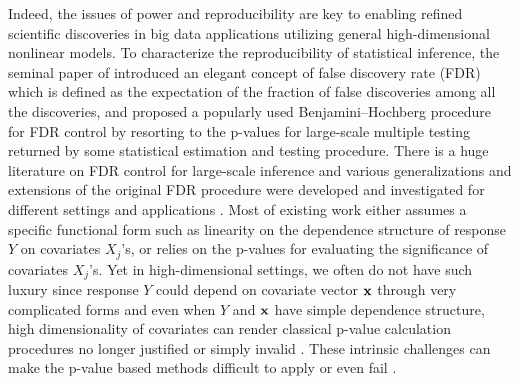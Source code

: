 \documentclass[11pt]{article}
\newcommand{\bx}{\mbox{\bf x}}
\begin{document}
Indeed, the issues of power and reproducibility are key to enabling refined scientific discoveries in big data applications utilizing general high-dimensional nonlinear models. To characterize the reproducibility of statistical inference, the seminal paper of \cite{BenjaminiHochberg1995} introduced an elegant concept of false discovery rate (FDR) which is defined as the expectation of the fraction of false discoveries among all the discoveries, and proposed a popularly used Benjamini--Hochberg %
procedure for FDR control by resorting to the p-values for large-scale multiple testing returned by some statistical estimation and testing procedure. There is a huge literature on FDR control for large-scale inference and various generalizations and extensions of the original FDR procedure were developed and investigated for different settings and applications \cite{BenjaminiYekutieli2001, EfronTibshirani2002, Storey2002, StoreyTaylorSiegmund2004, AbramovichBenjaminiDonohoJohnstone2006, Efron2007JASA, Efron2007AOS, FanHallYao2007, Wu2008, ClarkeHall2009, HallWang2010, FanFan2011, MengSunZhangWaterman2011, ZhangLiu2011, FanHanGu2012, LiuShao2014, SuCandes2016}. Most of existing work either assumes a specific functional form such as linearity
on the dependence structure of response $Y$ on covariates $X_j$'s, or relies on the p-values for evaluating the significance of covariates $X_j$'s. Yet in high-dimensional settings, we often do not have such luxury since response $Y$ could depend on covariate vector $\bx$ through very complicated forms and even when $Y$ and $\bx$ have simple dependence structure, high dimensionality of covariates can render classical p-value calculation procedures no longer justified or simply invalid \cite{Huber1973, FanDemirkayaLv2017, SurChenCandes2017}. These intrinsic challenges can make the p-value based methods difficult to apply or even fail \cite{CandesFanJansonLv2016}.
\end{document}
